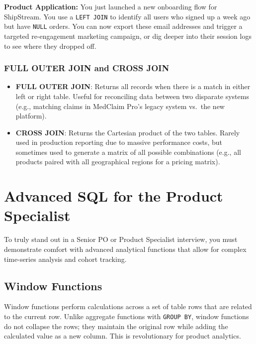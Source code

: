\documentclass[
  11pt,
  openany,
  oneside]{book}
\providecommand{\tightlist}{%
  \setlength{\itemsep}{0pt}\setlength{\parskip}{0pt}}
\begin{document}
\textbf{Product Application:} You just launched a new onboarding flow
for ShipStream. You use a \texttt{LEFT\ JOIN} to identify all users who
signed up a week ago but have \texttt{NULL} orders. You can now export
these email addresses and trigger a targeted re-engagement marketing
campaign, or dig deeper into their session logs to see where they
dropped off.

\subsubsection{FULL OUTER JOIN and CROSS
JOIN}\label{full-outer-join-and-cross-join}

\begin{itemize}
\tightlist
\item
  \textbf{FULL OUTER JOIN}: Returns all records when there is a match in
  either left or right table. Useful for reconciling data between two
  disparate systems (e.g., matching claims in MedClaim Pro's legacy
  system vs.~the new platform).
\item
  \textbf{CROSS JOIN}: Returns the Cartesian product of the two tables.
  Rarely used in production reporting due to massive performance costs,
  but sometimes used to generate a matrix of all possible combinations
  (e.g., all products paired with all geographical regions for a pricing
  matrix).
\end{itemize}

\bigskip

\section{Advanced SQL for the Product
Specialist}\label{advanced-sql-for-the-product-specialist}

To truly stand out in a Senior PO or Product Specialist interview, you
must demonstrate comfort with advanced analytical functions that allow
for complex time-series analysis and cohort tracking.

\subsection{Window Functions}\label{window-functions}

Window functions perform calculations across a set of table rows that
are related to the current row. Unlike aggregate functions with
\texttt{GROUP\ BY}, window functions do not collapse the rows; they
maintain the original row while adding the calculated value as a new
column. This is revolutionary for product analytics.
\end{document}
